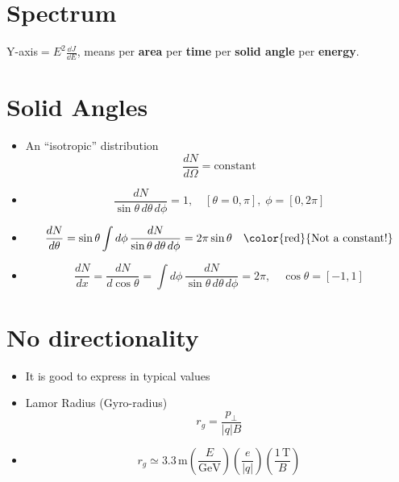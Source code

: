 \documentclass{sciposter}
\begin{document}
\begin{multicols}{3}


\section{Spectrum}

Y-axis$= E^{2}\frac{\dd{J}}{\dd{E}} $, means per \textbf{area} per \textbf{time} per \textbf{solid angle} per \textbf{energy}.


\section{Solid Angles}
\begin{itemize}
    \item An ``isotropic'' distribution
    \[
        \frac{dN}{d\Omega} = \text{constant}
    \]

    \item 
    \[
        \frac{dN}{\sin \theta \, d\theta \, d\phi} = 1, 
        \quad [\theta = 0, \pi], \; \phi = [0, 2\pi]
    \]

    \item 
    \[
        \frac{dN}{d\theta} 
        = \sin\theta \int d\phi \, 
        \frac{dN}{\sin \theta \, d\theta \, d\phi}
        = 2\pi \sin\theta 
        \quad \text{\color{red}{Not a constant!}}
    \]

    \item 
    \[
        \frac{dN}{dx} 
        = \frac{dN}{d\cos\theta}
        = \int d\phi \, 
        \frac{dN}{\sin \theta \, d\theta \, d\phi}
        = 2\pi, 
        \quad \cos\theta = [-1, 1]
    \]
\end{itemize}

\section{No directionality}

\begin{itemize}
    \item It is good to express in typical values

    \item Lamor Radius (Gyro-radius)
    \[
        r_g = \frac{p_\perp}{|q|B}
    \]

    \item 
    \[
        r_g \simeq 3.3\,\text{m}
        \left( \frac{E}{\text{GeV}} \right)
        \left( \frac{e}{|q|} \right)
        \left( \frac{1\,\text{T}}{B} \right)
    \]


\end{itemize}
\end{multicols}
\end{document}
